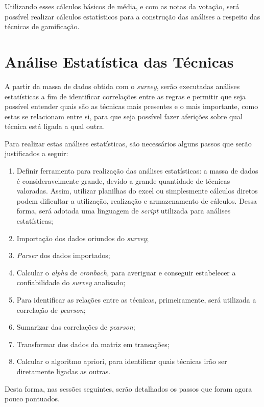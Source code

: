 Utilizando esses cálculos básicos de média, e com as notas da votação, será possível realizar cálculos estatísticos para a construção
das análises a respeito das técnicas de gamificação.



\section{Análise Estatística das Técnicas}
\label{sub:an_lise_estat_stica_das_t_cnicas}
A partir da massa de dados obtida com o \textit{survey}, serão executadas análises estatísticas a fim de identificar correlações
entre as regras e permitir que seja possível entender quais são as técnicas mais presentes e o mais importante, como
estas se relacionam entre si, para que seja possível fazer aferições sobre qual técnica está ligada a qual outra.

Para realizar estas análises estatísticas, são necessários alguns passos que serão justificados a seguir:

\begin{enumerate}
    \item Definir ferramenta para realização das análises estatísticas: a massa de dados é consideravelmente grande, devido 
        a grande quantidade de técnicas valoradas. Assim, utilizar planilhas do excel ou simplesmente cálculos diretos
        podem dificultar a utilização, realização e armazenamento de cálculos. Dessa forma, será adotada uma linguagem
        de \textit{script} utilizada para análises estatísticas;
    \item Importação dos dados oriundos do \textit{survey};
    \item \textit{Parser} dos dados importados;
    \item Calcular o \textit{alpha} de \textit{cronbach}, para averiguar e conseguir estabelecer a confiabilidade do \textit{survey} analisado;
    \item Para identificar as relações entre as técnicas, primeiramente, será utilizada a correlação de \textit{pearson};
    \item Sumarizar das correlações de \textit{pearson};
    \item Transformar dos dados da matriz em transações;
    \item Calcular o algoritmo apriori, para identificar quais técnicas irão ser diretamente ligadas as outras.
\end{enumerate}

Desta forma, nas sessões seguintes, serão detalhados os passos que foram agora pouco pontuados.

